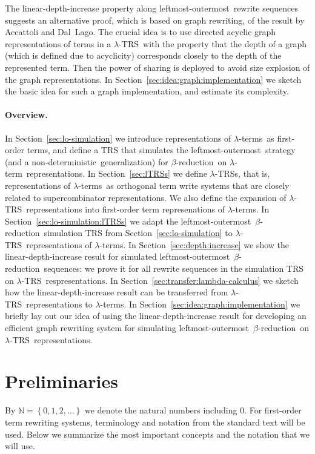 \documentclass[
submission
]{dmtcs-episciences-tampered}
\newcommand{\nb}{\nobreakdash}
\newcommand{\setexp}[1]{\left\{{#1}\right\}}
\newcommand{\nat}{\mathbb{N}}
\newcommand{\TRS}{TRS}
\newcommand{\lambdaterm}{$\lambda$\nb-term}
\newcommand{\lambdaterms}{\lambdaterm{s}}
\newcommand{\betareduction}{$\beta$\nb-re\-duc\-tion}
\newcommand{\lo}{left\-most-outer\-most}
\newcommand{\nondeterministic}{non-de\-ter\-min\-istic}
\newcommand{\lTRS}{$\lambda$\hspace*{-0.5pt}\nb-\hspace*{-0.5pt}\TRS}
\newcommand{\lTRSs}{\lTRS{s}}
\theoremstyle{plain}
\theoremstyle{definition}
\begin{document}
The linear-depth-increase property along \lo\ rewrite sequences suggests 
an alternative proof, which is based on graph rewriting, of the result by Accattoli and Dal~Lago.
The crucial idea is to use directed acyclic graph representations of terms in a \lTRS\
with the property that the depth of a graph (which is defined due to acyclicity) corresponds closely to the depth of the represented term. 
Then the power of sharing is deployed to avoid size explosion of the graph representations.
In Section~\ref{sec:idea:graph:implementation} we sketch the basic idea for 
such a graph implementation, and estimate its complexity.




\paragraph{Overview.}
  In Section~\ref{sec:lo-simulation}
    we introduce representations of \lambdaterms\ as first-order terms,
    and define a TRS that simulates the \lo\ strategy 
    (and a \nondeterministic\ generalization) for \betareduction\ 
on \lambdaterm\ representations. 
  In Section~\ref{sec:lTRSs} 
    we define \lTRSs, that is, representations of \lambdaterms\ as orthogonal term write systems
    that are closely related to supercombinator representations.
    We also define the expansion of \lTRS\ representations into first-order term represenations of \lambdaterms.
  In Section~\ref{sec:lo-simulation:lTRSs}
    we adapt the \lo\ \betareduction\ simulation TRS from Section~\ref{sec:lo-simulation} 
    to \lTRS\ representations of \lambdaterms.  
  In Section~\ref{sec:depth:increase}
    we show the linear-depth-increase result for simulated \lo\ \betareduction\ sequences:
    we prove it for all rewrite sequences in the simulation TRS on \lTRS\ respresentations.
  In Section~\ref{sec:transfer:lambda-calculus}
    we sketch how the linear-depth-increase result can be transferred from \lTRS\ representations to \lambdaterms.
  In Section~\ref{sec:idea:graph:implementation}
    we briefly lay out our idea of using the linear-depth-increase result 
    for developing an efficient graph rewriting system
    for simulating \lo\ \betareduction\ on \lTRS\ representations.


\section{Preliminaries}
  \label{prelims}


By $\nat = \setexp{0,1,2,\ldots}$ we denote the natural numbers including $0$.
For first-order term rewriting systems, terminology and notation from the standard text \cite{terese:2003} will be used.
Below we summarize the most important concepts and the notation that we will use. 
\end{document}
